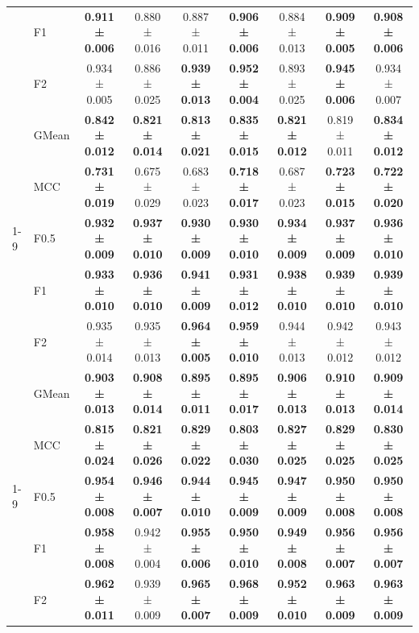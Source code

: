 \begin{table}[H]
{\begin{tabular}{llccccccc}
 & F1 & \textbf{0.911 ± 0.006} & 0.880 ± 0.016 & 0.887 ± 0.011 & \textbf{0.906 ± 0.006} & 0.884 ± 0.013 & \textbf{0.909 ± 0.005} & \textbf{0.908 ± 0.006} \\
 & F2 & 0.934 ± 0.005 & 0.886 ± 0.025 & \textbf{0.939 ± 0.013} & \textbf{0.952 ± 0.004} & 0.893 ± 0.025 & \textbf{0.945 ± 0.006} & 0.934 ± 0.007 \\
 & GMean & \textbf{0.842 ± 0.012} & \textbf{0.821 ± 0.014} & \textbf{0.813 ± 0.021} & \textbf{0.835 ± 0.015} & \textbf{0.821 ± 0.012} & 0.819 ± 0.011 & \textbf{0.834 ± 0.012} \\
 & MCC & \textbf{0.731 ± 0.019} & 0.675 ± 0.029 & 0.683 ± 0.023 & \textbf{0.718 ± 0.017} & 0.687 ± 0.023 & \textbf{0.723 ± 0.015} & \textbf{0.722 ± 0.020} \\
\cline{1-9}
\multirow[t]{5}{*}{RandomForest} & F0.5 & \textbf{0.932 ± 0.009} & \textbf{0.937 ± 0.010} & \textbf{0.930 ± 0.009} & \textbf{0.930 ± 0.010} & \textbf{0.934 ± 0.009} & \textbf{0.937 ± 0.009} & \textbf{0.936 ± 0.010} \\
 & F1 & \textbf{0.933 ± 0.010} & \textbf{0.936 ± 0.010} & \textbf{0.941 ± 0.009} & \textbf{0.931 ± 0.012} & \textbf{0.938 ± 0.010} & \textbf{0.939 ± 0.010} & \textbf{0.939 ± 0.010} \\
 & F2 & 0.935 ± 0.014 & 0.935 ± 0.013 & \textbf{0.964 ± 0.005} & \textbf{0.959 ± 0.010} & 0.944 ± 0.013 & 0.942 ± 0.012 & 0.943 ± 0.012 \\
 & GMean & \textbf{0.903 ± 0.013} & \textbf{0.908 ± 0.014} & \textbf{0.895 ± 0.011} & \textbf{0.895 ± 0.017} & \textbf{0.906 ± 0.013} & \textbf{0.910 ± 0.013} & \textbf{0.909 ± 0.014} \\
 & MCC & \textbf{0.815 ± 0.024} & \textbf{0.821 ± 0.026} & \textbf{0.829 ± 0.022} & \textbf{0.803 ± 0.030} & \textbf{0.827 ± 0.025} & \textbf{0.829 ± 0.025} & \textbf{0.830 ± 0.025} \\
\cline{1-9}
\multirow[t]{5}{*}{TabM} & F0.5 & \textbf{0.954 ± 0.008} & \textbf{0.946 ± 0.007} & \textbf{0.944 ± 0.010} & \textbf{0.945 ± 0.009} & \textbf{0.947 ± 0.009} & \textbf{0.950 ± 0.008} & \textbf{0.950 ± 0.008} \\
 & F1 & \textbf{0.958 ± 0.008} & 0.942 ± 0.004 & \textbf{0.955 ± 0.006} & \textbf{0.950 ± 0.010} & \textbf{0.949 ± 0.008} & \textbf{0.956 ± 0.007} & \textbf{0.956 ± 0.007} \\
 & F2 & \textbf{0.962 ± 0.011} & 0.939 ± 0.009 & \textbf{0.965 ± 0.007} & \textbf{0.968 ± 0.009} & \textbf{0.952 ± 0.010} & \textbf{0.963 ± 0.009} & \textbf{0.963 ± 0.009} \\

\end{tabular}}
\end{table}

